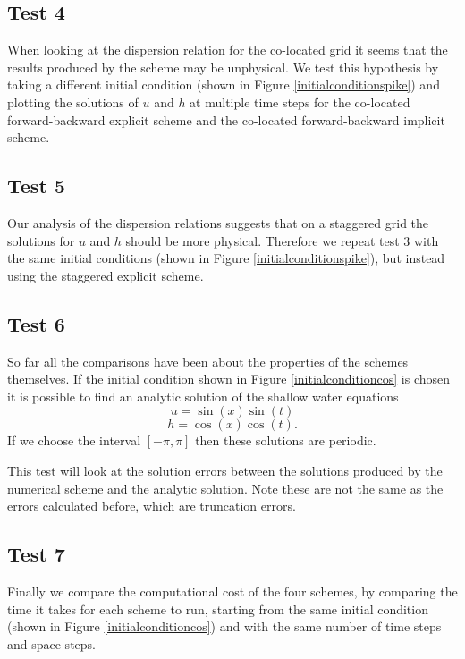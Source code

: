 \documentclass[a4paper,12pt, notitlepage]{article}
\begin{document}
\subsection{Test 4}
When looking at the dispersion relation for the co-located grid it seems that the results produced by the scheme may be unphysical. We test this hypothesis by taking a different initial condition (shown in Figure \ref{initialconditionspike}) and plotting the solutions of $u$ and $h$ at multiple time steps for the co-located forward-backward explicit scheme and the co-located forward-backward implicit scheme.

\subsection{Test 5}
Our analysis of the dispersion relations suggests that on a staggered grid the solutions for $u$ and $h$ should be more physical. Therefore we repeat test 3 with the same initial conditions (shown in Figure \ref{initialconditionspike}), but instead using the staggered explicit scheme.

\subsection{Test 6}
So far all the comparisons have been about the properties of the schemes themselves. If the initial condition shown in Figure \ref{initialconditioncos} is chosen it is possible to find an analytic solution of the shallow water equations
\begin{equation}
u = \sin(x)\sin(t)
\end{equation}
\begin{equation}
h = \cos(x)\cos(t).
\end{equation}
If we choose the interval $[-\pi, \pi]$ then these solutions are periodic.

This test will look at the solution errors between the solutions produced by the numerical scheme and the analytic solution. Note these are not the same as the errors calculated before, which are truncation errors. 


\subsection{Test 7}
Finally we compare the computational cost of the four schemes, by comparing the time it takes for each scheme to run, starting from the same initial condition (shown in Figure \ref{initialconditioncos}) and with the same number of time steps and space steps.
\end{document}
